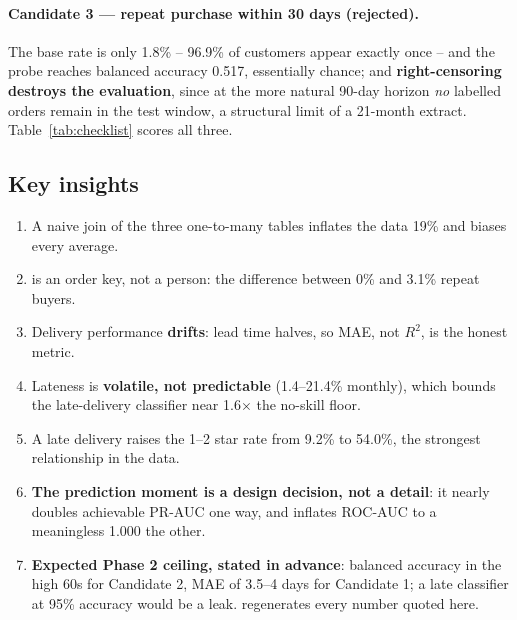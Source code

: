 \paragraph{Candidate 3 --- repeat purchase within 30 days (rejected).}
The base rate is only 1.8\% -- 96.9\% of customers appear exactly once -- and
the probe reaches balanced accuracy 0.517, essentially chance; and
\textbf{right-censoring destroys the evaluation}, since at the more natural
90-day horizon \emph{no} labelled orders remain in the test window, a structural
limit of a 21-month extract. Table~\ref{tab:checklist} scores all three.

\subsection{Key insights}

\begin{enumerate}\itemsep0pt
\item A naive join of the three one-to-many tables inflates the data 19\% and
biases every average.
\item {} is an order key, not a person: the difference between
0\% and 3.1\% repeat buyers.
\item Delivery performance \textbf{drifts}: lead time halves, so MAE, not $R^2$,
is the honest metric.
\item Lateness is \textbf{volatile, not predictable} (1.4--21.4\% monthly), which
bounds the late-delivery classifier near 1.6$\times$ the no-skill floor.
\item A late delivery raises the 1--2 star rate from 9.2\% to 54.0\%, the
strongest relationship in the data.
\item \textbf{The prediction moment is a design decision, not a detail}: it nearly
doubles achievable PR-AUC one way, and inflates ROC-AUC to a meaningless 1.000 the
other.
\item \textbf{Expected Phase 2 ceiling, stated in advance}: balanced accuracy in
the high 60s for Candidate 2, MAE of 3.5--4 days for Candidate 1; a late
classifier at 95\% accuracy would be a leak. 
regenerates every number quoted here.
\end{enumerate}

